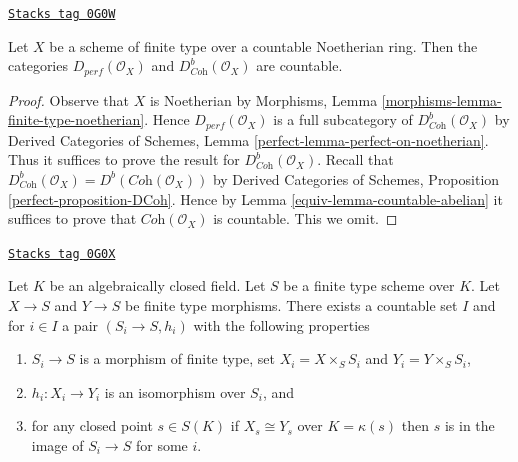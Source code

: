 \begin{lemma}
\label{equiv-lemma-countable-perfect}
\href{https://stacks.math.columbia.edu/tag/0G0W}{\texttt{Stacks tag 0G0W}}

Let $X$ be a scheme of finite type over a countable Noetherian ring.
Then the categories $D_{perf}(\mathcal{O}_X)$ and
$D^b_{\textit{Coh}}(\mathcal{O}_X)$ are countable.
\end{lemma}

\begin{proof}

Observe that $X$ is Noetherian by
Morphisms, Lemma \ref{morphisms-lemma-finite-type-noetherian}.
Hence $D_{perf}(\mathcal{O}_X)$ is a full subcategory of
$D^b_{\textit{Coh}}(\mathcal{O}_X)$ by
Derived Categories of Schemes, Lemma \ref{perfect-lemma-perfect-on-noetherian}.
Thus it suffices to prove
the result for $D^b_{\textit{Coh}}(\mathcal{O}_X)$.
Recall that
$D^b_{\textit{Coh}}(\mathcal{O}_X) = D^b(\textit{Coh}(\mathcal{O}_X))$
by
Derived Categories of Schemes, Proposition \ref{perfect-proposition-DCoh}.
Hence by Lemma \ref{equiv-lemma-countable-abelian}
it suffices to prove that $\textit{Coh}(\mathcal{O}_X)$ is
countable. This we omit.
\end{proof}

\begin{lemma}
\label{equiv-lemma-countable-isos}
\href{https://stacks.math.columbia.edu/tag/0G0X}{\texttt{Stacks tag 0G0X}}

Let $K$ be an algebraically closed field.
Let $S$ be a finite type scheme over $K$.
Let $X \to S$ and $Y \to S$ be finite type morphisms.
There exists a countable set $I$ and for $i \in I$ a pair
$(S_i \to S, h_i)$ with the following properties
\begin{enumerate}
\item $S_i \to S$ is a morphism of finite type, set
$X_i = X \times_S S_i$ and $Y_i = Y \times_S S_i$,
\item $h_i : X_i \to Y_i$ is an isomorphism over $S_i$, and
\item for any closed point $s \in S(K)$ if $X_s \cong Y_s$
over $K = \kappa(s)$ then $s$ is in the image of $S_i \to S$
for some $i$.
\end{enumerate}
\end{lemma}

